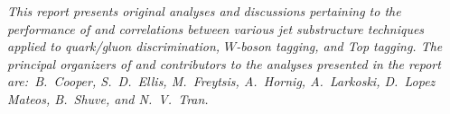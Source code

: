 \emph{This report presents original analyses and discussions pertaining to the performance of and correlations between various jet substructure techniques applied to quark/gluon discrimination, $W$-boson tagging, and Top tagging. The principal organizers of and contributors to the analyses presented in the report are:~B.~Cooper, S.~D.~Ellis, M.~Freytsis, A.~Hornig, A.~Larkoski, D.~Lopez Mateos, B.~Shuve, and N.~V.~Tran.}